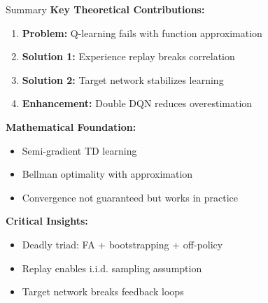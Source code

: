 \documentclass[aspectratio=169,10pt]{beamer}
\begin{document}
\begin{frame}{Summary}
\textbf{Key Theoretical Contributions:}
\begin{enumerate}
    \item \textbf{Problem:} Q-learning fails with function approximation
    \item \textbf{Solution 1:} Experience replay breaks correlation
    \item \textbf{Solution 2:} Target network stabilizes learning
    \item \textbf{Enhancement:} Double DQN reduces overestimation
\end{enumerate}

\vspace{0.3cm}
\textbf{Mathematical Foundation:}
\begin{itemize}
    \item Semi-gradient TD learning
    \item Bellman optimality with approximation
    \item Convergence not guaranteed but works in practice
\end{itemize}

\vspace{0.3cm}
\textbf{Critical Insights:}
\begin{itemize}
    \item Deadly triad: FA + bootstrapping + off-policy
    \item Replay enables i.i.d. sampling assumption
    \item Target network breaks feedback loops
\end{itemize}
\end{frame}
\end{document}

